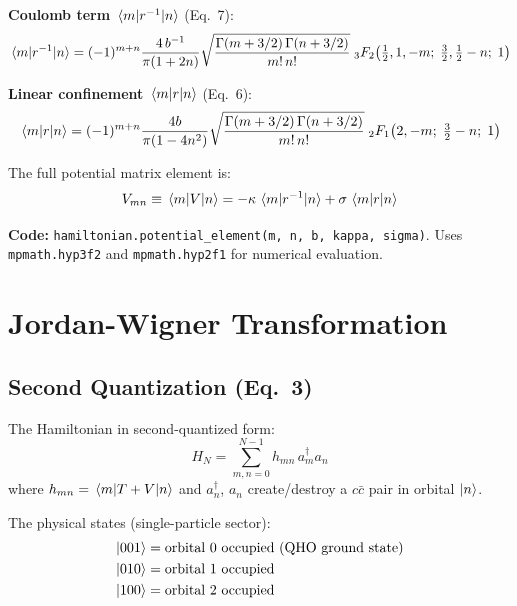 \documentclass[11pt,a4paper]{article}
\begin{document}
\textbf{Coulomb term} $\mel{m}{r^{-1}}{n}$ (Eq.~7):
\begin{equation}
  \mel{m}{r^{-1}}{n} = (-1)^{m+n} \frac{4\,b^{-1}}{\pi(1+2n)}
    \sqrt{\frac{\Gamma(m+3/2)\,\Gamma(n+3/2)}{m!\,n!}}\;
    {}_3F_2\!\left(\tfrac{1}{2}, 1, -m;\; \tfrac{3}{2}, \tfrac{1}{2}-n;\; 1\right)
  \label{eq:r_inv}
\end{equation}

\textbf{Linear confinement} $\mel{m}{r}{n}$ (Eq.~6):
\begin{equation}
  \mel{m}{r}{n} = (-1)^{m+n} \frac{4b}{\pi(1-4n^2)}
    \sqrt{\frac{\Gamma(m+3/2)\,\Gamma(n+3/2)}{m!\,n!}}\;
    {}_2F_1\!\left(2, -m;\; \tfrac{3}{2}-n;\; 1\right)
  \label{eq:r_lin}
\end{equation}

The full potential matrix element is:
\begin{equation}
  V_{mn} \equiv \mel{m}{V}{n} = -\kappa\,\mel{m}{r^{-1}}{n} + \sigma\,\mel{m}{r}{n}
  \label{eq:potential}
\end{equation}

\vspace{0.3em}
\noindent\textbf{Code:} \texttt{hamiltonian.potential\_element(m, n, b, kappa, sigma)}.
Uses \texttt{mpmath.hyp3f2} and \texttt{mpmath.hyp2f1} for numerical evaluation.


\section{Jordan-Wigner Transformation}

\subsection{Second Quantization (Eq.~3)}

The Hamiltonian in second-quantized form:
\begin{equation}
  H_N = \sum_{m,n=0}^{N-1} h_{mn}\, a_m^\dagger a_n
  \label{eq:second_quant}
\end{equation}
where $h_{mn} = \mel{m}{T+V}{n}$ and $a_n^\dagger$, $a_n$ create/destroy a $c\bar{c}$ pair in orbital $\ket{n}$.

The physical states (single-particle sector):
\begin{align}
  \ket{001} &= \text{orbital 0 occupied (QHO ground state)} \nonumber \\
  \ket{010} &= \text{orbital 1 occupied} \nonumber \\
  \ket{100} &= \text{orbital 2 occupied} \nonumber
\end{align}
\end{document}
